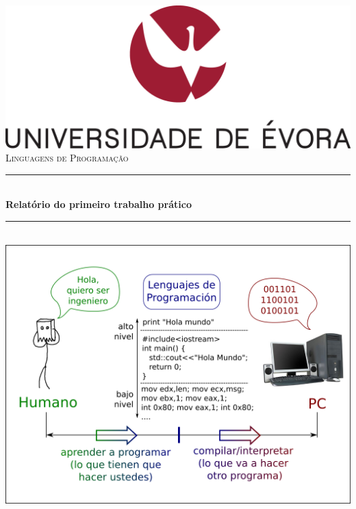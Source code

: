 \documentclass[a4paper,12pt,headings=small]{article}
\begin{document}
\begin{titlepage}

\newcommand{\HRule}{\rule{\linewidth}{0.5mm}} %

\center %





\includegraphics[scale=1]{uelogo.png}\\[0.5cm] 

 

\textsc{\Large Linguagens de Programação}\\[1cm]



\HRule \\[0.4cm]
{ \huge \bfseries Relatório do primeiro trabalho prático}\\[0.4cm] 
\HRule \\[1 cm]
 
\includegraphics[scale=0.3]{lp.png}\\[0.5cm] 


\end{titlepage}
\end{document}
